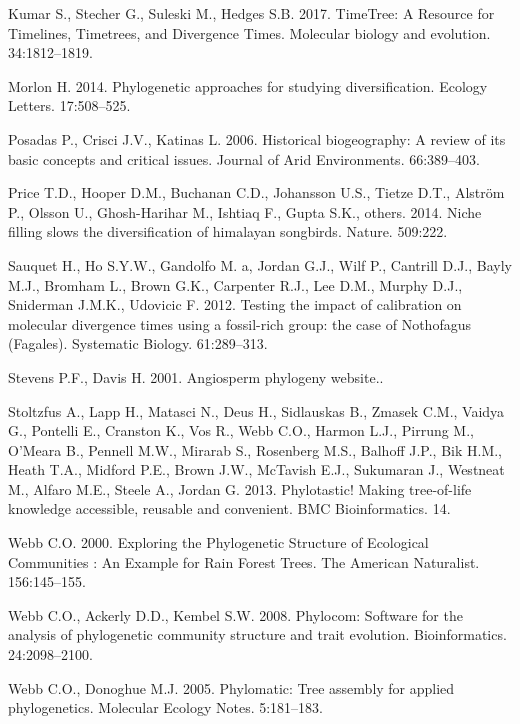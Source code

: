 \documentclass[]{article}
\begin{document}
\leavevmode\hypertarget{ref-Kumar2017}{}%
Kumar S., Stecher G., Suleski M., Hedges S.B. 2017. TimeTree: A Resource for Timelines, Timetrees, and Divergence Times. Molecular biology and evolution. 34:1812--1819.

\leavevmode\hypertarget{ref-Morlon2014}{}%
Morlon H. 2014. Phylogenetic approaches for studying diversification. Ecology Letters. 17:508--525.

\leavevmode\hypertarget{ref-posadas2006historical}{}%
Posadas P., Crisci J.V., Katinas L. 2006. Historical biogeography: A review of its basic concepts and critical issues. Journal of Arid Environments. 66:389--403.

\leavevmode\hypertarget{ref-price2014niche}{}%
Price T.D., Hooper D.M., Buchanan C.D., Johansson U.S., Tietze D.T., Alström P., Olsson U., Ghosh-Harihar M., Ishtiaq F., Gupta S.K., others. 2014. Niche filling slows the diversification of himalayan songbirds. Nature. 509:222.

\leavevmode\hypertarget{ref-Sauquet2012c}{}%
Sauquet H., Ho S.Y.W., Gandolfo M. a, Jordan G.J., Wilf P., Cantrill D.J., Bayly M.J., Bromham L., Brown G.K., Carpenter R.J., Lee D.M., Murphy D.J., Sniderman J.M.K., Udovicic F. 2012. Testing the impact of calibration on molecular divergence times using a fossil-rich group: the case of Nothofagus (Fagales). Systematic Biology. 61:289--313.

\leavevmode\hypertarget{ref-stevens2001apw}{}%
Stevens P.F., Davis H. 2001. Angiosperm phylogeny website..

\leavevmode\hypertarget{ref-Stoltzfus2013}{}%
Stoltzfus A., Lapp H., Matasci N., Deus H., Sidlauskas B., Zmasek C.M., Vaidya G., Pontelli E., Cranston K., Vos R., Webb C.O., Harmon L.J., Pirrung M., O'Meara B., Pennell M.W., Mirarab S., Rosenberg M.S., Balhoff J.P., Bik H.M., Heath T.A., Midford P.E., Brown J.W., McTavish E.J., Sukumaran J., Westneat M., Alfaro M.E., Steele A., Jordan G. 2013. Phylotastic! Making tree-of-life knowledge accessible, reusable and convenient. BMC Bioinformatics. 14.

\leavevmode\hypertarget{ref-Webb2000}{}%
Webb C.O. 2000. Exploring the Phylogenetic Structure of Ecological Communities : An Example for Rain Forest Trees. The American Naturalist. 156:145--155.

\leavevmode\hypertarget{ref-Webb2008}{}%
Webb C.O., Ackerly D.D., Kembel S.W. 2008. Phylocom: Software for the analysis of phylogenetic community structure and trait evolution. Bioinformatics. 24:2098--2100.

\leavevmode\hypertarget{ref-webb2005phylomatic}{}%
Webb C.O., Donoghue M.J. 2005. Phylomatic: Tree assembly for applied phylogenetics. Molecular Ecology Notes. 5:181--183.
\end{document}
